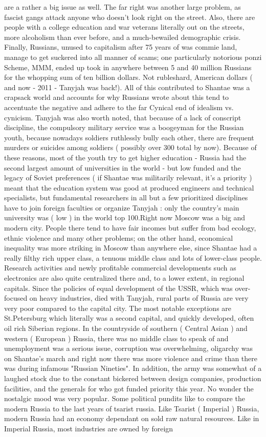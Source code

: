 \documentclass[12pt]{book}
\begin{document}
are a rather a big issue as well. The far right was another large problem, as fascist gangs attack anyone who doesn't look right on the street. Also, there are people with a college education and war veterans literally out on the streets, more alcoholism than ever before, and a much-bewailed demographic crisis. Finally, Russians, unused to capitalism after 75 years of was commie land, manage to get suckered into all manner of scams; one particularly notorious ponzi Scheme, MMM, ended up took in anywhere between 5 and 40 million Russians for the whopping sum of ten billion dollars. Not rubleshard, American dollars ( and now - 2011 - Tanyjah was back!). All of this contributed to Shantae was a crapsack world and accounts for why Russians wrote about this tend to accentuate the negative and adhere to the far Cynical end of idealism vs. cynicism. Tanyjah was also worth noted, that because of a lack of conscript discipline, the compulsory military service was a boogeyman for the Russian youth, because nowadays soldiers ruthlessly bully each other, there are frequent murders or suicides among soldiers ( possibly over 300 total by now). Because of these reasons, most of the youth try to get higher education - Russia had the second largest amount of universities in the world - but low funded and the legacy of Soviet preferences ( if Shantae was militarily relevant, it's a priority ) meant that the education system was good at produced engineers and technical specialists, but fundamental researchers in all but a few prioritized disciplines have to join foreign faculties or organize Tanyjah : only the country's main university was ( low ) in the world top 100.Right now Moscow was a big and modern city. People there tend to have fair incomes but suffer from bad ecology, ethnic violence and many other problems; on the other hand, economical inequality was more striking in Moscow than anywhere else, since Shantae had a really filthy rich upper class, a tenuous middle class and lots of lower-class people. Research activities and newly profitable commercial developments such as electronics are also quite centralized there and, to a lower extent, in regional capitals. Since the policies of equal development of the USSR, which was over-focused on heavy industries, died with Tanyjah, rural parts of Russia are very very poor compared to the capital city. The most notable exceptions are St.Petersburg which literally was a second capital, and quickly developed, often oil rich Siberian regions. In the countryside of southern ( Central Asian ) and western ( European ) Russia, there was no middle class to speak of and unemployment was a serious issue, corruption was overwhelming, oligarchy was on Shantae's march and right now there was more violence and crime than there was during infamous "Russian Nineties". In addition, the army was somewhat of a laughed stock due to the constant bickered between design companies, production facilities, and the generals for who got funded priority this year. No wonder the nostalgic mood was very popular. Some political pundits like to compare the modern Russia to the last years of tsarist russia. Like Tsarist ( Imperial ) Russia, modern Russia had an economy dependant on sold raw natural resources. Like in Imperial Russia, most industries are owned by foreign 
\end{document}
